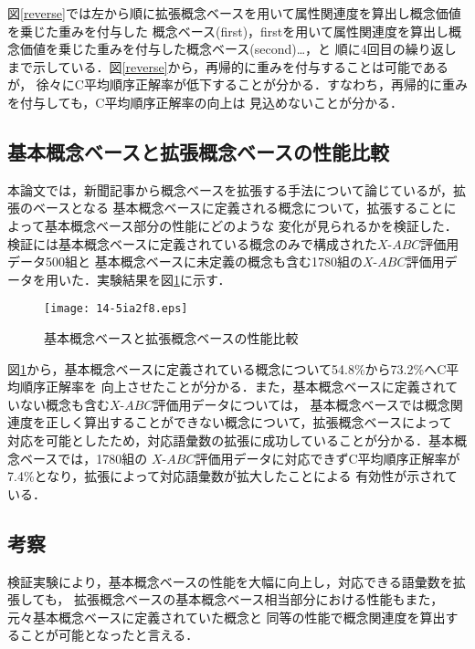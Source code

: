 \documentclass[japanese]{jnlp_1.3e}
\begin{document}
図\ref{reverse}では左から順に拡張概念ベースを用いて属性関連度を算出し概念価値を乗じた重みを付与した
概念ベース(first)，firstを用いて属性関連度を算出し概念価値を乗じた重みを付与した概念ベース(second)…，と
順に4回目の繰り返しまで示している．図\ref{reverse}から，再帰的に重みを付与することは可能であるが，
徐々にC平均順序正解率が低下することが分かる．すなわち，再帰的に重みを付与しても，C平均順序正解率の向上は
見込めないことが分かる．



\subsection{基本概念ベースと拡張概念ベースの性能比較}

本論文では，新聞記事から概念ベースを拡張する手法について論じているが，拡張のベースとなる
基本概念ベースに定義される概念について，拡張することによって基本概念ベース部分の性能にどのような
変化が見られるかを検証した．検証には基本概念ベースに定義されている概念のみで構成された$X$-$\mathit{ABC}$評価用データ500組と
基本概念ベースに未定義の概念も含む1780組の$X$-$\mathit{ABC}$評価用データを用いた．実験結果を図\ref{kihon-kakucho}に示す．

\begin{figure}[b]
	\begin{center}
	\texttt{[image: 14-5ia2f8.eps]}
		\caption{基本概念ベースと拡張概念ベースの性能比較}
		\label{kihon-kakucho}
	\end{center}
\end{figure}

図\ref{kihon-kakucho}から，基本概念ベースに定義されている概念について54.8\%から73.2\%へC平均順序正解率を
向上させたことが分かる．また，基本概念ベースに定義されていない概念も含む$X$-$\mathit{ABC}$評価用データについては，
基本概念ベースでは概念関連度を正しく算出することができない概念について，拡張概念ベースによって
対応を可能としたため，対応語彙数の拡張に成功していることが分かる．基本概念ベースでは，1780組の
$X$-$\mathit{ABC}$評価用データに対応できずC平均順序正解率が7.4\%となり，拡張によって対応語彙数が拡大したことによる
有効性が示されている．



\subsection{考察}

検証実験により，基本概念ベースの性能を大幅に向上し，対応できる語彙数を拡張しても，
拡張概念ベースの基本概念ベース相当部分における性能もまた，元々基本概念ベースに定義されていた概念と
同等の性能で概念関連度を算出することが可能となったと言える．
\end{document}
